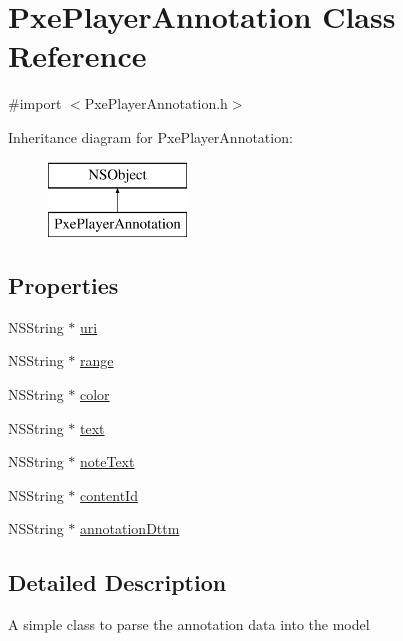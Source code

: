 \hypertarget{interface_pxe_player_annotation}{\section{Pxe\-Player\-Annotation Class Reference}
\label{interface_pxe_player_annotation}
}


{\ttfamily \#import $<$Pxe\-Player\-Annotation.\-h$>$}

Inheritance diagram for Pxe\-Player\-Annotation\-:\begin{figure}[H]
\begin{center}
\leavevmode
\includegraphics[height=2.000000cm]{interface_pxe_player_annotation}
\end{center}
\end{figure}
\subsection*{Properties}
\begin{DoxyCompactItemize}
\item 
N\-S\-String $\ast$ \hyperlink{interface_pxe_player_annotation_ad4de16b477c5185f1e2cc7e3dc381478}{uri}
\item 
N\-S\-String $\ast$ \hyperlink{interface_pxe_player_annotation_ab9e7b0ca1d2b10388be7ee64fa7f348b}{range}
\item 
N\-S\-String $\ast$ \hyperlink{interface_pxe_player_annotation_a9ea3bee20ee473fc614a0e0d6201dc8c}{color}
\item 
N\-S\-String $\ast$ \hyperlink{interface_pxe_player_annotation_a385bff815a8ba52e6c228d0cb0003e2f}{text}
\item 
N\-S\-String $\ast$ \hyperlink{interface_pxe_player_annotation_a3c3cccd23a46f7ed8726e4788ca32517}{note\-Text}
\item 
N\-S\-String $\ast$ \hyperlink{interface_pxe_player_annotation_a49526a2d5685f06b970713a85f4e18c5}{content\-Id}
\item 
N\-S\-String $\ast$ \hyperlink{interface_pxe_player_annotation_afe13281cb5ee83fbaee6367daf2519df}{annotation\-Dttm}
\end{DoxyCompactItemize}


\subsection{Detailed Description}
A simple class to parse the annotation data into the model 

